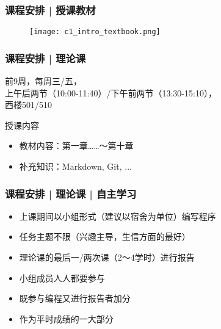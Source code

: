 \begin{frame}
  \frametitle{课程安排 | 授课教材}
  \begin{figure}
    \centering
    \texttt{[image: c1\_intro\_textbook.png]}
  \end{figure}
\end{frame}

\begin{frame}
  \frametitle{课程安排 | 理论课}
  \begin{center}
  \alert{前9周，每周三/五，\\ 上午后两节（10:00-11:40）/下午前两节（13:30-15:10），\\ 西楼501/510}\\
  \vspace{0.2cm}
  \end{center}
  \begin{block}{授课内容}
    \begin{itemize}
      \item 教材内容：第一章……～第十章
      \item 补充知识：Markdown, Git, ...
    \end{itemize}
  \end{block}
\end{frame}

\begin{frame}
  \frametitle{课程安排 | 理论课 | 自主学习}
  \begin{itemize}
    \item 上课期间以小组形式（建议以宿舍为单位）编写程序
    \item 任务主题不限（兴趣主导，生信方面的最好）
    \item 理论课的最后一/两次课（2～4学时）进行报告
    \item 小组成员人人都要参与
    \item 既参与编程又进行报告者加分
    \item 作为平时成绩的一大部分
  \end{itemize}
\end{frame}

